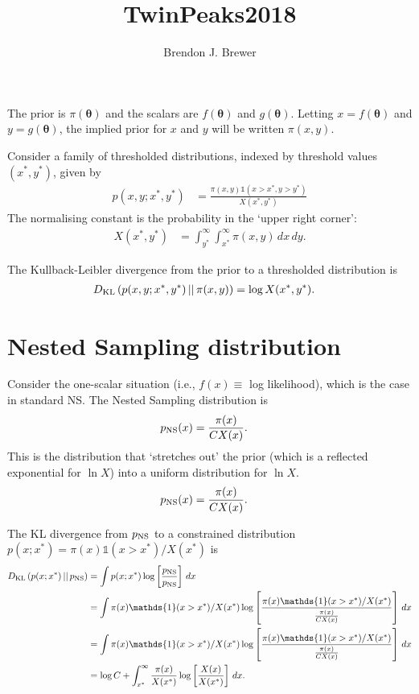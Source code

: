 \documentclass[a4paper, 12pt]{article}
\title{TwinPeaks2018}
\author{Brendon J. Brewer}
\newcommand{\btheta}{\boldsymbol{\theta}}
\begin{document}
\maketitle


\setlength{\parindent}{0pt}
\setlength{\parskip}{8pt}

The prior is $\pi(\btheta)$ and the scalars are
$f(\btheta)$ and $g(\btheta)$. Letting $x=f(\btheta)$ and $y=g(\btheta)$,
the implied prior for $x$ and $y$ will be written $\pi(x, y)$.

Consider a family of thresholded distributions, indexed by threshold
values $(x^*, y^*)$, given by
\begin{align}
p(x, y; x^*, y^*) &= \frac{\pi(x, y)\mathds{1}(x > x^*, y > y^*)}
                          {X(x^*, y^*)}
\end{align}
The normalising constant is the probability in the `upper right corner':
\begin{align}
X(x^*, y^*) &= \int_{y^*}^{\infty} \int_{x^*}^{\infty} \pi(x, y) \, dx \, dy.
\end{align}

The Kullback-Leibler divergence from the prior to a thresholded distribution
is
\begin{align}
D_{\rm KL}\left(p(x, y; x^*, y^*) \,||\, \pi(x, y)\right) &=
    \log X(x^*, y^*).
\end{align}

\section{Nested Sampling distribution}
Consider the one-scalar situation (i.e., $f(x) \equiv$ log likelihood),
which is the case in standard NS. The Nested Sampling distribution is
\begin{align}
p_{\rm NS}(x) &= \frac{\pi(x)}{C X(x)}.
\end{align}
This is the distribution that `stretches out' the prior (which is a
reflected exponential for $\ln X$) into a uniform distribution for $\ln X$.
\begin{align}
p_{\rm NS}(x) &= \frac{\pi(x)}{C X(x)}.
\end{align}

The KL divergence from $p_{\rm NS}$ to a constrained distribution
$p(x; x^*) = \pi(x)\mathds{1}(x > x^*)/X(x^*)$ is
\begin{align}
D_{\rm KL}\left(p(x; x^*) \,||\, p_{\rm NS}\right)
    &= \int p(x; x^*)
            \log \left[\frac{p_{\rm NS}}{p_{\rm NS}}\right] \, dx \\
    &= \int \pi(x)\mathds{1}(x > x^*)/X(x^*)
            \log \left[\frac{\pi(x)\mathds{1}(x > x^*)/X(x^*)}
                            {\frac{\pi(x)}{C X(x)}}\right] \, dx \\
    &= \int \pi(x)\mathds{1}(x > x^*)/X(x^*)
            \log \left[\frac{\pi(x)\mathds{1}(x > x^*)/X(x^*)}
                            {\frac{\pi(x)}{C X(x)}}\right] \, dx \\
    &= \log C + \int_{x^*}^{\infty} \frac{\pi(x)}{X(x^*)}
            \log \left[\frac{X(x)}{X(x^*)}\right] \, dx.
\end{align}
\end{document}
